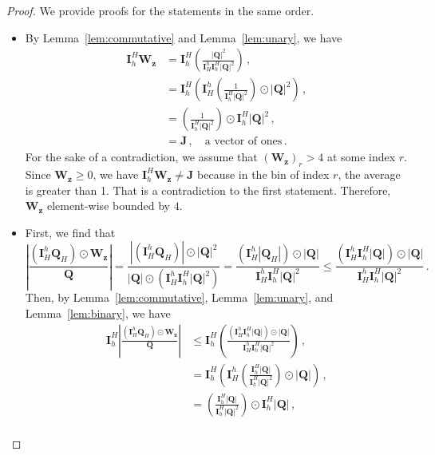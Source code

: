 \documentclass[10pt,a4paper]{amsart}
\begin{document}
\begin{proof} We provide proofs for the statements in the same order. 
\begin{itemize}
    \item By Lemma~\ref{lem:commutative} and Lemma~\ref{lem:unary}, we have
    \begin{equation*}
        \begin{aligned}
            \bm{I}_h^H{\bm{W}_{\bm{z}}} &= \bm{I}_h^H\left( \frac{|\bm{Q}|^2}{\bm{I}_H^h\bm{I}_h^H|\bm{Q}|^2}\right)\,,\\
            &= \bm{I}_h^H\left( \bm{I}_H^h\left(\frac{1}{\bm{I}_h^H|\bm{Q}|^2}\right)\odot|\bm{Q}|^2\right)\,,\\
            &= \left(\frac{1}{\bm{I}_h^H|\bm{Q}|^2}\right)\odot\bm{I}_h^H|\bm{Q}|^2\,,\\
            &= \bm{J}\,,\quad\text{a vector of ones}\,.
        \end{aligned}
    \end{equation*}
    For the sake of a contradiction, we assume that $(\bm{W}_{\bm{z}})_r > 4$ at some index $r$. Since $\bm{W}_{\bm{z}}\geq 0$, we have $\bm{I}_h^H{\bm{W}_{\bm{z}}}\neq \bm{J}$ because in the bin of index $r$, the average is greater than 1. That is a contradiction to the first statement. Therefore, $\bm{W}_{\bm{z}}$ element-wise bounded by $4$.
    \item First, we find that
    \begin{equation*}
        \left|\frac{(\bm{I}_H^h\bm{Q}_H)\odot\bm{W}_{\bm{z}}}{\bm{Q}}\right| =  \frac{|(\bm{I}_H^h\bm{Q}_H)|\odot|\bm{Q}|^2}{|\bm{Q}|\odot\left(\bm{I}_H^h\bm{I}_h^H|\bm{Q}|^2\right)} = \frac{\left(\bm{I}_H^h|\bm{Q}_H|\right)\odot|\bm{Q}|}{\bm{I}_H^h\bm{I}_h^H|\bm{Q}|^2}\leq \frac{\left(\bm{I}_H^h\bm{I}_h^H|\bm{Q}|\right)\odot|\bm{Q}|}{\bm{I}_H^h\bm{I}_h^H|\bm{Q}|^2} \,.
    \end{equation*}
    Then, by Lemma~\ref{lem:commutative}, Lemma~\ref{lem:unary}, and Lemma~\ref{lem:binary}, we have
    \begin{equation*}
        \begin{aligned}
            \bm{I}_h^H\left|\frac{(\bm{I}_H^h\bm{Q}_H)\odot\bm{W}_{\bm{z}}}{\bm{Q}}\right|&\leq\bm{I}_h^H\left(\frac{\left(\bm{I}_H^h\bm{I}_h^H|\bm{Q}|\right)\odot|\bm{Q}|}{\bm{I}_H^h\bm{I}_h^H|\bm{Q}|^2}\right)\,,\\&=\bm{I}_h^H\left(\bm{I}_H^h\left(\frac{\bm{I}_h^H|\bm{Q}|}{\bm{I}_h^H|\bm{Q}|^2}\right)\odot|\bm{Q}|\right)\,,\\
            &=\left(\frac{\bm{I}_h^H|\bm{Q}|}{\bm{I}_h^H|\bm{Q}|^2}\right)\odot\bm{I}_h^H|\bm{Q}|\,,\\

\end{aligned}
\end{equation*}
\end{itemize}
\end{proof}
\end{document}
